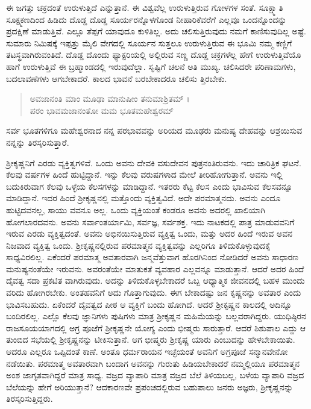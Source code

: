 ಈ ಜಗತ್ತು ಚಕ್ರದಂತೆ ಉರುಳುತ್ತಿದೆ ಎನ್ನುತ್ತಾನೆ. ಈ ವಿಶ್ವವೆಲ್ಲ ಉರುಳುತ್ತಿರುವ ಗೋಳಗಳ ಸಂತೆ. ಸೂಕ್ಷ್ಮಾತಿ ಸೂಕ್ಷ್ಮಕಣದಿಂದ ಹಿಡಿದು ದೊಡ್ಡ ದೊಡ್ಡ ಸೂರ್ಯರನ್ನೊಳಗೊಂಡ ನೀಹಾರಿಕೆವರೆಗೆ ಎಲ್ಲವೂ ಒಂದನ್ನೊಂದನ್ನು ಪ್ರದಕ್ಷಿಣೆ ಮಾಡುತ್ತಿವೆ. ಎಲ್ಲೂ ತೆಪ್ಪಗೆ ಯಾವುದೂ ಕುಳಿತಿಲ್ಲ. ಅದು ಚಲಿಸುತ್ತಿರುವುದು ನಮಗೆ ಕಾಣಿಸುವುದಿಲ್ಲ ಅಷ್ಟೆ. ಸುಮಾರು ನಿಮಿಷಕ್ಕೆ ಇಪ್ಪತ್ತು ಮೈಲಿ ವೇಗದಲ್ಲಿ ಸೂರ್ಯನ ಸುತ್ತಲೂ ಉರುಳುತ್ತಿರುವ ಈ ಭೂಮಿ ನಮ್ಮ ಕಣ್ಣಿಗೆ ತಟಸ್ಥವಾಗಿರುವಂತಿದೆ. ದೊಡ್ಡ ದೊಂದು ಫ್ಯಾಕ್ಟರಿಯಲ್ಲಿ ಅಲ್ಲಿರುವ ಸಣ್ಣ ದೊಡ್ಡ ಚಕ್ರಗಳೆಲ್ಲ ಹೇಗೆ ಉರುಳುತ್ತಿವೆಯೊ ಹಾಗೆ ಉರುಳುತ್ತಿವೆ ಈ ಬ್ರಹ್ಮಾಂಡದಲ್ಲಿ ಇರುವುದೆಲ್ಲಾ. ಸೃಷ್ಟಿಗೆ ಚಲನೆ ಅತಿ ಮುಖ್ಯ. ಚಲಿಸಿದರೇ ಪರಿಣಾಮಗಳು, ಬದಲಾವಣೆಗಳು ಆಗಬೇಕಾದರೆ. ಕಾಲದ ಭಾವನೆ ಬರಬೇಕಾದರೂ ಚಲಿಸು ತ್ತಿರಬೇಕು.

\begin{verse}
ಅವಜಾನಂತಿ ಮಾಂ ಮೂಢಾ ಮಾನುಷೀಂ ತನುಮಾಶ್ರಿತಮ್ ।\\ಪರಂ ಭಾವಮಜಾನಂತೋ ಮಮ ಭೂತಮಹೇಶ್ವರಮ್ 
\end{verse}

{\small ಸರ್ವ ಭೂತಗಳಿಗೂ ಮಹೇಶ್ವರನಾದ ನನ್ನ ಪರಭಾವವನ್ನು ಅರಿಯದ ಮೂಢರು ಮನುಷ್ಯ ದೇಹವನ್ನು ಆಶ್ರಯಿಸುವ ನನ್ನನ್ನು ತಿರಸ್ಕರಿಸುತ್ತಾರೆ.}

ಶ್ರೀಕೃಷ್ಣನಿಗೆ ಎರಡು ವ್ಯಕ್ತಿತ್ವಗಳಿವೆ. ಒಂದು ಅವನು ದೇವಕಿ ವಸುದೇವನ ಪುತ್ರನಂತಿರುವನು. ಇದು ಚಾರಿತ್ರಿಕ ಘಟನೆ. ಕೆಲವು ವರ್ಷಗಳ ಹಿಂದೆ ಹುಟ್ಟಿದ್ದಾನೆ. ಇನ್ನು ಕೆಲವು ವರುಷಗಳಾದ ಮೇಲೆ ತೀರಿಹೋಗುತ್ತಾನೆ. ಅವನು ಇಲ್ಲಿ ಬದುಕಿರುವಾಗ ಕೆಲವು ಒಳ್ಳೆಯ ಕೆಲಸಗಳನ್ನು ಮಾಡಿದ್ದಾನೆ. ಇತರರು ಕೆಟ್ಟ ಕೆಲಸ ಎಂದು ಭಾವಿಸುವ ಕೆಲಸವನ್ನೂ ಮಾಡಿದ್ದಾನೆ. ಇದರ ಹಿಂದೆ ಶ್ರೀಕೃಷ್ಣನಲ್ಲಿ ಮತ್ತೊಂದು ವ್ಯಕ್ತಿತ್ವವಿದೆ. ಅದೇ ಪರಮಾತ್ಮನದು. ಅವನು ಎಂದೂ ಹುಟ್ಟಿದವನಲ್ಲ, ಸಾಯು ವವನೂ ಅಲ್ಲ. ಒಂದು ವ್ಯಕ್ತಿಯಂತೆ ಕಂಡರೂ ಅವನು ಅದರಲ್ಲಿ ಖಾಲಿಯಾಗಿ ಹೋಗಲಾರದವನು. ಅವನು ಸರ್ವಾಂತರ್ಯಾಮಿ, ಸರ್ವಜ್ಞ, ಸರ್ವಶಕ್ತ. ಇದು ನಾಟಕದಲ್ಲಿ ಪಾತ್ರ ಮಾಡುವವನಿಗೆ ಇರುವ ಎರಡು ವ್ಯಕ್ತಿತ್ವದಂತೆ. ಅವನು ಅಭಿನಯಿಸುತ್ತಿರುವ ವ್ಯಕ್ತಿತ್ವ ಒಂದು, ಮತ್ತು ಅದರ ಹಿಂದೆ ಇರುವ ಅವನ ನಿಜವಾದ ವ್ಯಕ್ತಿತ್ವ ಒಂದು. ಶ್ರೀಕೃಷ್ಣನಲ್ಲಿರುವ ಪರಮಾತ್ಮನ ವ್ಯಕ್ತಿತ್ವವನ್ನು ಎಲ್ಲರಿಗೂ ತಿಳಿದುಕೊಳ್ಳುವುದಕ್ಕೆ ಸಾಧ್ಯವಿರಲಿಲ್ಲ. ಏಕೆಂದರೆ ಪರಮಾತ್ಮ ಅವತಾರವಾಗಿ ಜನ್ಮವೆತ್ತುವಾಗ ಹೊರಗಿನಿಂದ ನೋಡಿದರೆ ಅವನು ಸಾಧಾರಣ ಮನುಷ್ಯನಂತೆಯೇ ಇರುವನು. ಅವರಂತೆಯೇ ಮಾತುಕತೆ ವ್ಯವಹಾರ ಎಲ್ಲವನ್ನೂ ಮಾಡುತ್ತಾನೆ. ಆದರೆ ಅದರ ಹಿಂದೆ ದೈವತ್ವ ಸದಾ ಪ್ರಕಟಿತ ವಾಗಿರುವುದು. ಅದನ್ನು ತಿಳಿದುಕೊಳ್ಳಬೇಕಾದರೆ ಒಬ್ಬ ಆಧ್ಯಾತ್ಮಿಕ ಜೀವನದಲ್ಲಿ ಬಹಳ ಮುಂದು ವರಿದು ಹೋಗಿರಬೇಕು. ಅಂತಹವನಿಗೆ ಅದು ಗೊತ್ತಾಗುವುದು. ಈಗ ಬೇಕಾದಷ್ಟು ಜನ ಕೃಷ್ಣನನ್ನು ಅವತಾರ ಎಂದು ಭಾವಿಸಬಹುದು. ಏಕೆಂದರೆ ದೈವತ್ವದ ಪೀಠ ಆ ವ್ಯಕ್ತಿಗೆ ಬಂದು ಹೋಗಿದೆ. ಆದರೆ ಶ್ರೀಕೃಷ್ಣನ ಕಾಲದಲ್ಲಿ ಅದಿನ್ನೂ ಬಂದಿರಲಿಲ್ಲ. ಎಲ್ಲೊ ಕೆಲವು ಜ್ಞಾನಿಗಳು ಪುಷಿಗಳು ಮಾತ್ರ ಶ್ರೀಕೃಷ್ಣನ ಮಹಿಮೆಯನ್ನು ಬಲ್ಲವರಾಗಿದ್ದರು. ಯುಧಿಷ್ಠಿರನ ರಾಜಸೂಯಯಾಗದಲ್ಲಿ ಅಗ್ರ ಪೂಜೆಗೆ ಶ್ರೀಕೃಷ್ಣನೇ ಯೋಗ್ಯ ಎಂದು ಭೀಷ್ಮರು ಸಾರುತ್ತಾರೆ. ಆದರೆ ಶಿಶುಪಾಲ ಎದ್ದು ಆ ತುಂಬಿದ ಸಭೆಯಲ್ಲಿ ಶ್ರೀಕೃಷ್ಣನನ್ನು ಟೀಕಿಸುತ್ತಾನೆ. ಆಗ ಭೀಷ್ಮರು ಶ್ರೀಕೃಷ್ಣ ಯಾರು ಎಂಬುದನ್ನು ಹೇಳಬೇಕಾಯಿತು. ಆದರೂ ಎಲ್ಲರೂ ಒಪ್ಪಿದಂತೆ ಕಾಣೆ. ಅಂತೂ ಧರ್ಮರಾಯನ ಇಚ್ಛೆಯಂತೆ ಅವನಿಗೆ ಅಗ್ರಪೂಜೆ ಸನ್ಮಾನವೇನೋ ನಡೆಯಿತು. ಪರಮಾತ್ಮ ಅವತಾರವಾಗಿ ಬಂದಾಗ ಅವನನ್ನು ಗುರುತು ಹಿಡಿಯಬೇಕಾದರೆ ನಮ್ಮಲ್ಲಿಯೂ ಪರಮಾತ್ಮನ ಅಂಶ ಜಾಗೃತವಾಗಿದ್ದರೆ ಮಾತ್ರ ಸಾಧ್ಯ. ವಜ್ರದ ವ್ಯಾಪಾರಿ ಮಾತ್ರ ವಜ್ರದ ಬೆಲೆ ತಿಳಿಯಬಲ್ಲ, ಬಳೆಯ ವ್ಯಾಪಾರಿ ವಜ್ರದ ಬೆಲೆಯನ್ನು ಹೇಗೆ ಅರಿಯುತ್ತಾನೆ? ಆದಕಾರಣವೇ ಪ್ರಪಂಚದಲ್ಲಿರುವ ಬಹುಪಾಲು ಜನರು ಅಜ್ಞರು, ಶ್ರೀಕೃಷ್ಣನನ್ನು ತಿರಸ್ಕರಿಸುತ್ತಿದ್ದರು.

